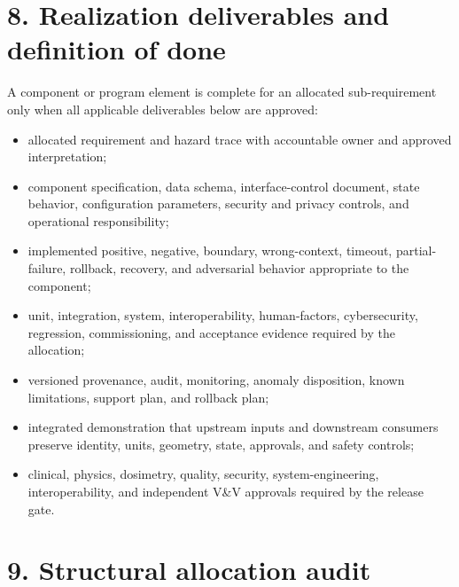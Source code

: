 \documentclass[11pt,letterpaper]{article}
\begin{document}
\section{8. Realization deliverables and definition of done}
A component or program element is complete for an allocated sub-requirement only when all applicable deliverables below are approved:
\begin{itemize}
\item allocated requirement and hazard trace with accountable owner and approved interpretation;
\item component specification, data schema, interface-control document, state behavior, configuration parameters, security and privacy controls, and operational responsibility;
\item implemented positive, negative, boundary, wrong-context, timeout, partial-failure, rollback, recovery, and adversarial behavior appropriate to the component;
\item unit, integration, system, interoperability, human-factors, cybersecurity, regression, commissioning, and acceptance evidence required by the allocation;
\item versioned provenance, audit, monitoring, anomaly disposition, known limitations, support plan, and rollback plan;
\item integrated demonstration that upstream inputs and downstream consumers preserve identity, units, geometry, state, approvals, and safety controls;
\item clinical, physics, dosimetry, quality, security, system-engineering, interoperability, and independent V\&V approvals required by the release gate.
\end{itemize}

\section{9. Structural allocation audit}
\end{document}
